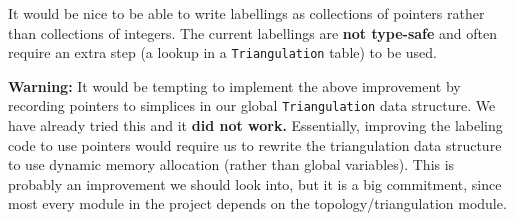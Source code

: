 \documentclass[10pt]{article}%
\begin{document}
It would be nice to be able to write labellings as collections of pointers rather than collections of integers. The current labellings are \textbf{not type-safe} and often require an extra step (a lookup in a \texttt{Triangulation} table) to be used.

\textbf{Warning:} It would be tempting to implement the above improvement by recording pointers to simplices in our global \texttt{Triangulation} data structure. We have already tried this and it \textbf{did not work.} Essentially, improving the labeling code to use pointers would require us to rewrite the triangulation data structure to use dynamic memory allocation (rather than global variables). This is probably an improvement we should look into, but it is a big commitment, since most every module in the project depends on the topology/triangulation module. 
    

%
\end{document}
